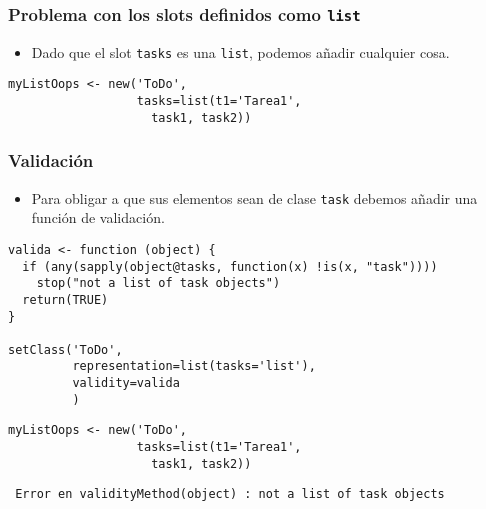 \documentclass[xcolor={usenames,svgnames,dvipsnames}]{beamer}
\begin{document}
\begin{frame}[fragile]
\frametitle{Problema con los slots definidos como \texttt{list}}
\label{sec-3-1-7}

\begin{itemize}
\item Dado que el slot \texttt{tasks} es una \texttt{list}, podemos añadir cualquier
  cosa.
\end{itemize}

\lstset{language=R}
\begin{lstlisting}
myListOops <- new('ToDo',
                  tasks=list(t1='Tarea1',
                    task1, task2))
\end{lstlisting}
\end{frame}
\begin{frame}[fragile]
\frametitle{Validación}
\label{sec-3-1-8}

\begin{itemize}
\item Para obligar a que sus elementos sean de clase \texttt{task} debemos añadir
  una función de validación.
\end{itemize}

\lstset{language=R}
\begin{lstlisting}
valida <- function (object) {
  if (any(sapply(object@tasks, function(x) !is(x, "task")))) 
    stop("not a list of task objects")
  return(TRUE)
}

setClass('ToDo',
         representation=list(tasks='list'),
         validity=valida
         )
\end{lstlisting}



\lstset{language=R}
\begin{lstlisting}
myListOops <- new('ToDo',
                  tasks=list(t1='Tarea1',
                    task1, task2))
\end{lstlisting}

\begin{verbatim}
 Error en validityMethod(object) : not a list of task objects
\end{verbatim}
\end{frame}
\end{document}
